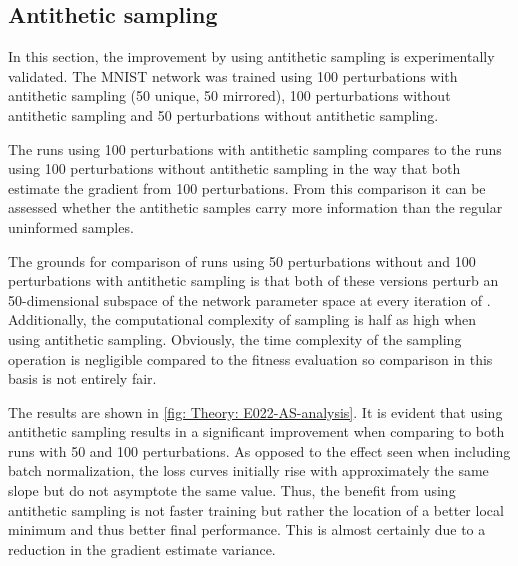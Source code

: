 \subsection{Antithetic sampling}\label{sec: Experimental work: Antithetic sampling}
In this section, the improvement by using antithetic sampling is experimentally validated. The \gls{MNIST} network was trained using 100 perturbations with antithetic sampling (50 unique, 50 mirrored), 100 perturbations without antithetic sampling and 50 perturbations without antithetic sampling. 

The runs using 100 perturbations with antithetic sampling compares to the runs using 100 perturbations without antithetic sampling in the way that both estimate the gradient from 100 perturbations. From this comparison it can be assessed whether the antithetic samples carry more information than the regular uninformed samples.

The grounds for comparison of runs using 50 perturbations without and 100 perturbations with antithetic sampling is that both of these versions perturb an 50-dimensional subspace of the network parameter space at every iteration of .
Additionally, the computational complexity of sampling is half as high when using antithetic sampling.
Obviously, the time complexity of the sampling operation is negligible compared to the fitness evaluation so comparison in this basis is not entirely fair.

The results are shown in \autoref{fig: Theory: E022-AS-analysis}. It is evident that using antithetic sampling results in a significant improvement when comparing to both runs with 50 and 100 perturbations. As opposed to the effect seen when including batch normalization, the loss curves initially rise with approximately the same slope but do not asymptote the same value. Thus, the benefit from using antithetic sampling is not faster training but rather the location of a better local minimum and thus better final performance. This is almost certainly due to a reduction in the gradient estimate variance. 

